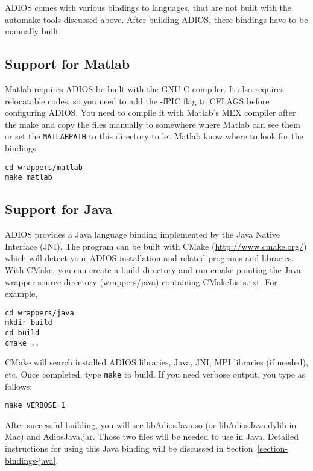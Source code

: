 ADIOS comes with various bindings to languages, that are not built with the automake tools discussed above. After building ADIOS, these bindings have to be manually built.

\subsection{Support for Matlab}
\label{section-install-matlab}

Matlab requires ADIOS be built with the GNU C compiler. It also requires relocatable 
codes, so you need to add the -fPIC flag to CFLAGS before configuring ADIOS. 
You need to compile it with Matlab's MEX compiler after the make and copy the files 
manually to somewhere where Matlab can see them or set the \verb+MATLABPATH+ to this 
directory to let Matlab know where to look for the bindings.

\begin{lstlisting}
cd wrappers/matlab
make matlab
\end{lstlisting}


\subsection{Support for Java}
\label{section-install-java}

ADIOS provides a Java language binding implemented by the Java Native Interface (JNI).
The program can be built with CMake (\url{http://www.cmake.org/}) which will detect your ADIOS installation and related programs and libraries. With CMake, you can create a build directory and run cmake pointing the Java wrapper source directory (wrappers/java) containing CMakeLists.txt. For example, 
\begin{lstlisting}
cd wrappers/java
mkdir build
cd build
cmake ..
\end{lstlisting}

CMake will search installed ADIOS libraries, Java, JNI, MPI libraries (if
needed), etc. Once completed, type \verb+make+ to build. If you need verbose output, you type as follows:
\begin{lstlisting}
make VERBOSE=1
\end{lstlisting}

After successful building, you will see libAdiosJava.so (or
libAdiosJava.dylib in Mac) and AdiosJava.jar. Those two files will be needed to use in Java. Detailed instructions for using this Java binding will be discussed in Section~\ref{section-bindings-java}.

